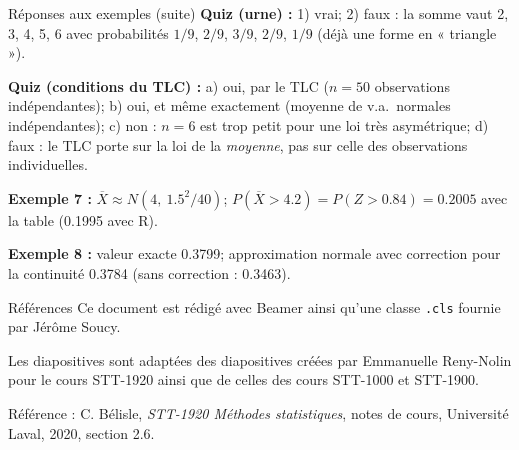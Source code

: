 \documentclass{BeamerTemplate}
\begin{document}
\begin{frame}[t]{Réponses aux exemples (suite)}
  \scriptsize
  \textbf{Quiz (urne) :} 1) vrai; 2) faux : la somme vaut 2, 3, 4, 5, 6 avec
  probabilités $1/9$, $2/9$, $3/9$, $2/9$, $1/9$ (déjà une forme en
  « triangle »).

  \smallskip
  \textbf{Quiz (conditions du TLC) :} a) oui, par le TLC ($n = 50$
  observations indépendantes); b) oui, et même exactement (moyenne de v.a.\
  normales indépendantes); c) non : $n = 6$ est trop petit pour une loi très
  asymétrique; d) faux : le TLC porte sur la loi de la \emph{moyenne}, pas sur
  celle des observations individuelles.

  \smallskip
  \textbf{Exemple 7 :} $\overline{X} \approx N(4,\ 1.5^2/40)$;
  $P(\overline{X} > 4.2) = P(Z > 0.84) = 0.2005$ avec la table (0.1995 avec
  R).

  \smallskip
  \textbf{Exemple 8 :} valeur exacte 0.3799; approximation normale avec
  correction pour la continuité 0.3784 (sans correction : 0.3463).
\end{frame}

\begin{frame}[t]{Références}
  Ce document est rédigé avec Beamer ainsi qu'une classe \texttt{.cls} fournie
  par Jérôme Soucy.

  \medskip
  Les diapositives sont adaptées des diapositives créées par Emmanuelle
  Reny-Nolin pour le cours STT-1920 ainsi que de celles des cours STT-1000 et
  STT-1900.

  \medskip
  Référence : C. Bélisle, \emph{STT-1920 Méthodes statistiques}, notes de
  cours, Université Laval, 2020, section 2.6.
\end{frame}
\end{document}
